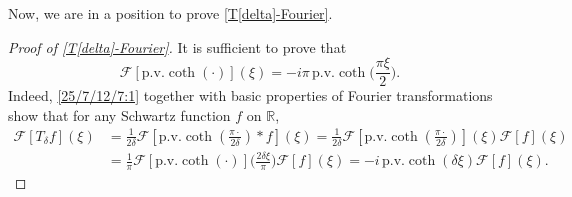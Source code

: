 \documentclass{amsart}
\numberwithin{equation}{section}
\newcommand{\Td}{T_{\delta}}
\newcommand{\pv}{\textrm{p.v.}}
\begin{document}
Now, we are in a position to prove \eqref{T[delta]-Fourier}. 
\begin{proof}[Proof of \eqref{T[delta]-Fourier}]
It is sufficient to prove that 
\begin{equation}\label{25/7/12/7:1}
\mathcal{F}[\pv\coth{(\cdot)}](\xi) = -i \pi \, \pv\coth{\Big(\frac{\pi \xi}{2}\Big)} .
\end{equation}
Indeed, \eqref{25/7/12/7:1} together with basic properties of Fourier transformations show that for any Schwartz function $f$ on $\mathbb{R}$, 
\begin{align*}
\mathcal{F}[\Td f](\xi)
&= \frac{1}{2\delta} \mathcal{F}\left[ \pv \coth{\left( \frac{\pi \cdot}{2\delta}\right)}* f\right](\xi)=\frac{1}{2\delta} \mathcal{F}\left[\pv\coth{\left( \frac{\pi \cdot}{2\delta}\right)}\right](\xi)
\mathcal{F}[f](\xi) \\
&=\frac{1}{\pi} \mathcal{F}\left[\pv \coth{(\cdot)}\right]\Big(\frac{2\delta \xi}{\pi}\Big)\mathcal{F}[f](\xi)=-i\, \pv \coth{\left(\delta \xi \right)}\mathcal{F}[f](\xi).
\end{align*}


\end{proof}
\end{document}
